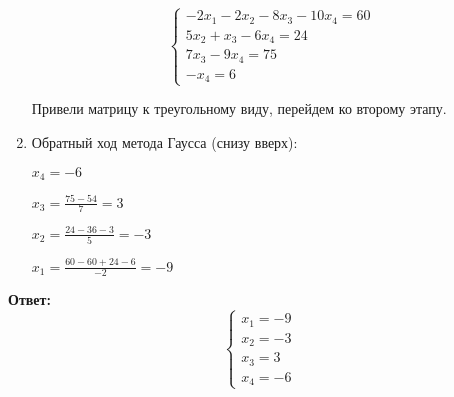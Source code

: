 \documentclass[a4paper,12pt]{article} %
\begin{document}
\begin{enumerate}
\begin{equation*}
    \begin{cases}
    -2x_1 - 2x_2 - 8x_3 - 10x_4 = 60\\
    5x_2 + x_3 - 6x_4 = 24\\
    7x_3 - 9x_4 = 75\\
    -x_4 = 6
    \end{cases}
\end{equation*}

Привели матрицу к треугольному виду, перейдем ко второму этапу.

\item Обратный ход метода Гаусса (снизу вверх):

$x_4 = -6$

$x_3 = \frac{75 - 54}{7} = 3$

$x_2 = \frac{24 - 36 - 3}{5} = -3$

$x_1 = \frac{60 - 60 + 24 - 6}{-2} = -9$

\end{enumerate}
\begin{center}
\Large \textbf{Ответ:}
\begin{equation*}
    \begin{cases}
    x_1 = -9\\
    x_2 = -3\\
    x_3 = 3\\
    x_4 = -6
    \end{cases}
\end{equation*}
\end{center}
\end{document}
